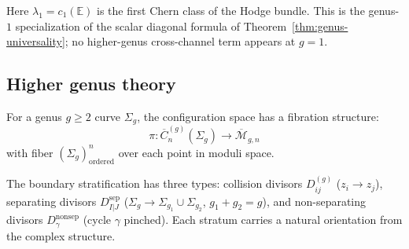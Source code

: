 \begin{theorem}
Here $\lambda_1=c_1(\mathbb{E})$ is the first Chern class of the
Hodge bundle. This is the genus-$1$ specialization of the scalar
diagonal formula of Theorem~\ref{thm:genus-universality}; no
higher-genus cross-channel term appears at $g=1$.
\end{theorem}


\subsection{Higher genus theory}\label{subsec:higher-genus}

\begin{definition}\label{def:higher-genus-config}
For a genus $g \geq 2$ curve $\Sigma_g$, the configuration space has a fibration structure:
\[\pi: \overline{C}_n^{(g)}(\Sigma_g) \to \overline{\mathcal{M}}_{g,n}\]
with fiber $(\Sigma_g)^n_{\text{ordered}}$ over each point in moduli space.

The boundary stratification has three types: collision divisors $D_{ij}^{(g)}$ ($z_i \to z_j$), separating divisors $D_{I|J}^{\text{sep}}$ ($\Sigma_g \to \Sigma_{g_1} \cup \Sigma_{g_2}$, $g_1 + g_2 = g$), and non-separating divisors $D_\gamma^{\text{nonsep}}$ (cycle $\gamma$ pinched). Each stratum carries a natural orientation from the complex structure.
\end{definition}

